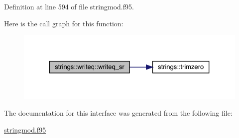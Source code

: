 Definition at line 594 of file stringmod.\+f95.

Here is the call graph for this function\+:\nopagebreak
\begin{figure}[H]
\begin{center}
\leavevmode
\includegraphics[width=327pt]{interfacestrings_1_1writeq_a2c9743fd678c7eb3387f7acae35de200_cgraph}
\end{center}
\end{figure}


The documentation for this interface was generated from the following file\+:\begin{DoxyCompactItemize}
\item 
\hyperlink{stringmod_8f95}{stringmod.\+f95}\end{DoxyCompactItemize}
